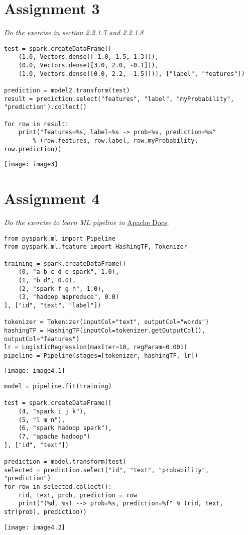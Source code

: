 \documentclass[]{article}
\begin{document}
\section*{Assignment 3}
\emph{ Do the exercise in section 2.2.1.7 and 2.2.1.8 }

\begin{verbatim}
test = spark.createDataFrame([
	(1.0, Vectors.dense([-1.0, 1.5, 1.3])),
	(0.0, Vectors.dense([3.0, 2.0, -0.1])),
	(1.0, Vectors.dense([0.0, 2.2, -1.5]))], ["label", "features"])

prediction = model2.transform(test)
result = prediction.select("features", "label", "myProbability", "prediction").collect()

for row in result:
	print("features=%s, label=%s -> prob=%s, prediction=%s"
		% (row.features, row.label, row.myProbability, row.prediction))
\end{verbatim}
\texttt{[image: image3]} %


\section*{Assignment 4}

\emph{ Do the exercise to learn ML pipeline in }
\href{https://spark.apache.org/docs/2.4.0/ml-pipeline.html#example-pipeline
}{Apache Docs}.
 

\begin{verbatim}
from pyspark.ml import Pipeline
from pyspark.ml.feature import HashingTF, Tokenizer

training = spark.createDataFrame([
	(0, "a b c d e spark", 1.0),
	(1, "b d", 0.0),
	(2, "spark f g h", 1.0),
	(3, "hadoop mapreduce", 0.0)
], ["id", "text", "label"])

tokenizer = Tokenizer(inputCol="text", outputCol="words")
hashingTF = HashingTF(inputCol=tokenizer.getOutputCol(), outputCol="features")
lr = LogisticRegression(maxIter=10, regParam=0.001)
pipeline = Pipeline(stages=[tokenizer, hashingTF, lr])
\end{verbatim}
\texttt{[image: image4.1]} %


\begin{verbatim}
model = pipeline.fit(training)

test = spark.createDataFrame([
	(4, "spark i j k"),
	(5, "l m n"),
	(6, "spark hadoop spark"),
	(7, "apache hadoop")
], ["id", "text"])

prediction = model.transform(test)
selected = prediction.select("id", "text", "probability", "prediction")
for row in selected.collect():
	rid, text, prob, prediction = row
	print("(%d, %s) --> prob=%s, prediction=%f" % (rid, text, str(prob), prediction))
\end{verbatim}
\texttt{[image: image4.2]} %
\end{document}
